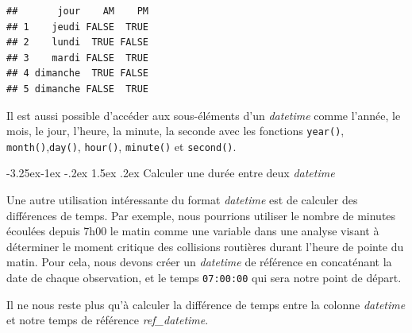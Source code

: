 \documentclass[
  11pt,
  french,
]{book}
\makeatletter
\newenvironment{Shaded}{\begin{snugshade}}{\end{snugshade}}
\newcommand{\DataTypeTok}[1]{\textcolor[rgb]{0.13,0.29,0.53}{#1}}
\newcommand{\DecValTok}[1]{\textcolor[rgb]{0.00,0.00,0.81}{#1}}
\newcommand{\KeywordTok}[1]{\textcolor[rgb]{0.13,0.29,0.53}{\textbf{#1}}}
\newcommand{\NormalTok}[1]{#1}
\newcommand{\OperatorTok}[1]{\textcolor[rgb]{0.81,0.36,0.00}{\textbf{#1}}}
\newcommand{\StringTok}[1]{\textcolor[rgb]{0.31,0.60,0.02}{#1}}
\newenvironment{kframe}{%
\medskip{}
\setlength{\fboxsep}{.8em}
 \def\at@end@of@kframe{}%
 \ifinner\ifhmode%
  \def\at@end@of@kframe{\end{minipage}}%
  \begin{minipage}{\columnwidth}%
 \fi\fi%
 \def\FrameCommand##1{\hskip\@totalleftmargin \hskip-\fboxsep
 \colorbox{shadecolor}{##1}\hskip-\fboxsep
     \hskip-\linewidth \hskip-\@totalleftmargin \hskip\columnwidth}%
 \MakeFramed {\advance\hsize-\width
   \@totalleftmargin\z@ \linewidth\hsize
   \@setminipage}}%
 {\par\unskip\endMakeFramed%
 \at@end@of@kframe}
\renewenvironment{Shaded}{\begin{kframe}}{\end{kframe}}
\renewcommand\paragraph{\@startsection{paragraph}{4}{\z@}%
   {-3.25ex\@plus -1ex \@minus -.2ex}%
   {1.5ex \@plus .2ex}%
   {\normalfont\normalsize\bfseries}}
\makeatother
\begin{document}
\begin{verbatim}
##       jour    AM    PM
## 1    jeudi FALSE  TRUE
## 2    lundi  TRUE FALSE
## 3    mardi FALSE  TRUE
## 4 dimanche  TRUE FALSE
## 5 dimanche FALSE  TRUE
\end{verbatim}

Il est aussi possible d'accéder aux sous-éléments d'un \emph{datetime} comme l'année, le mois, le jour, l'heure, la minute, la seconde avec les fonctions \texttt{year()}, \texttt{month()},\texttt{day()}, \texttt{hour()}, \texttt{minute()} et \texttt{second()}.

\hypertarget{sect014263}{%
\paragraph{\texorpdfstring{Calculer une durée entre deux \emph{datetime}}{Calculer une durée entre deux datetime}}\label{sect014263}}

Une autre utilisation intéressante du format \emph{datetime} est de calculer des différences de temps. Par exemple, nous pourrions utiliser le nombre de minutes écoulées depuis 7h00 le matin comme une variable dans une analyse visant à déterminer le moment critique des collisions routières durant l'heure de pointe du matin.
Pour cela, nous devons créer un \emph{datetime} de référence en concaténant la date de chaque observation, et le temps \texttt{07:00:00} qui sera notre point de départ.

\begin{Shaded}
\end{Shaded}

Il ne nous reste plus qu'à calculer la différence de temps entre la colonne \emph{datetime} et notre temps de référence \emph{ref\_datetime}.

\begin{Shaded}
\end{Shaded}
\end{document}

